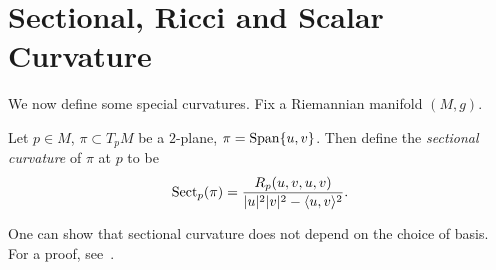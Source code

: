 \section{Sectional, Ricci and Scalar Curvature}

We now define some special curvatures.
Fix a Riemannian manifold $(M,g)$.

\begin{defn}
    Let $p\in M$, $\pi\subset T_pM$ be a $2$-plane, $\pi=\operatorname{Span}\{u,v\}$.
    Then define the \emph{sectional curvature} of $\pi$ at $p$ to be
    \[\operatorname{Sect}_p(\pi)=\frac{R_p(u,v,u,v)}{|u|^2|v|^2-\langle u,v\rangle^2}.\]
\end{defn}

\begin{rem}
    One can show that sectional curvature does not depend on the choice of basis.
    For a proof, see~\cite[Proposition~3.1]{doCarmo}.
\end{rem}

